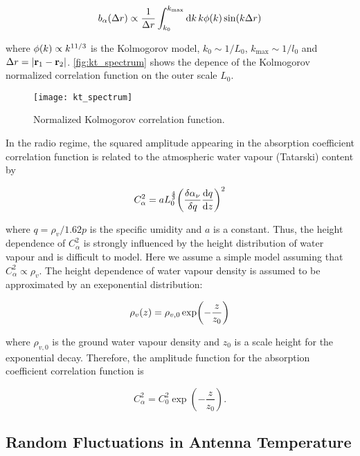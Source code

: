 \begin{equation}
        b_\alpha\qty(\Delta r) \propto \frac{1}{\Delta r}
        \int^{k_\text{max}}_{k_0} \dd{k} k \phi\qty(k) \sin(k\Delta r)
\end{equation}

where $\phi\qty(k) \propto k^{11/3}$ is the Kolmogorov model, $k_0 \sim
1/L_0$, $k_\text{max} \sim 1/l_0$ and $\Delta r = \abs{\vb{r}_1 -
\vb{r}_2}$. \autoref{fig:kt_spectrum} shows the depence of the Kolmogorov
normalized correlation function on the outer scale $L_0$.

\begin{figure}
        \centering
        \texttt{[image: kt\_spectrum]}
        \caption{Normalized Kolmogorov correlation function.}
        \label{fig:kt_spectrum}
\end{figure}

In the radio regime, the squared amplitude appearing in the absorption
coefficient correlation function is related to the atmospheric water vapour
(Tatarski) content by

\begin{equation}
        C^2_\alpha = a L^\frac{4}{3}_0 \qty(\fdv{\alpha_\nu}{q}
        \dv{q}{z})^2
\end{equation}

where $q = \rho_v/1.62p$ is the specific umidity and $a$ is a constant.
Thus, the height dependence of $C^2_\alpha$ is strongly influenced by the
height distribution of water vapour and is difficult to model. Here we
assume a simple model assuming that $C^2_\alpha \propto \rho_v$. The height
dependence of water vapour density is assumed to be approximated by an
exeponential distribution:

\begin{equation}
        \rho_v\qty(z) = \rho_{v,0} \exp(-\frac{z}{z_0})
\end{equation}

where $\rho_{v,0}$ is the ground water vapour density and $z_0$ is a scale
height for the exponential decay. Therefore, the amplitude function for the
absorption coefficient correlation function is

\begin{equation}
        C^2_\alpha = C^2_0\exp(-\frac{z}{z_0}).
\end{equation}

\subsection{Random Fluctuations in Antenna Temperature}

